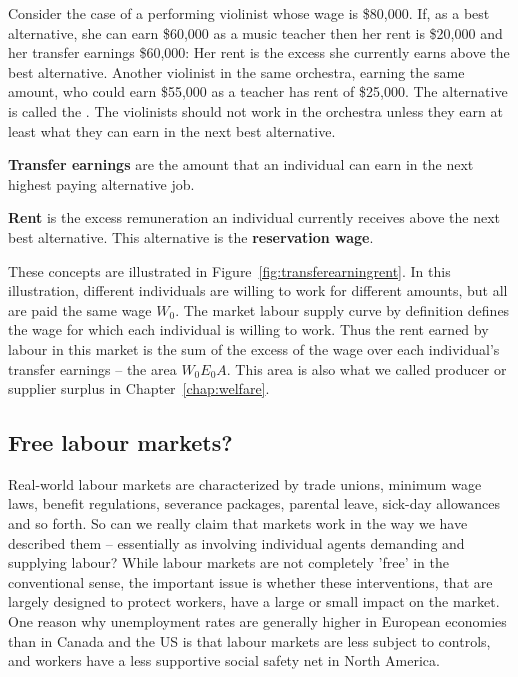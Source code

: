 Consider the case of a performing violinist whose wage is \$80,000. If, as a
best alternative, she can earn \$60,000 as a music teacher then her rent is
\$20,000 and her transfer earnings \$60,000: Her rent is the excess she
currently earns above the best alternative. Another violinist in the same
orchestra, earning the same amount, who could earn \$55,000 as a teacher has
rent of \$25,000. The alternative is called the . The violinists should not work in the orchestra unless they earn at
least what they can earn in the next best alternative.

\begin{DefBox}
\textbf{Transfer earnings} are the amount that an individual can earn in the next highest paying alternative job.

\textbf{Rent} is the excess remuneration an individual currently receives above the next best alternative. This alternative is the \textbf{reservation wage}.
\end{DefBox}

These concepts are illustrated in Figure~\ref{fig:transferearningrent}. In
this illustration, different individuals are willing to work for different
amounts, but all are paid the same wage $W_{0}$. The market labour supply
curve by definition defines the wage for which each individual is willing to
work. Thus the rent earned by labour in this market is the sum of the excess
of the wage over each individual's transfer earnings -- the area $W_{0}E_{0}A$. 
This area is also what we called producer or supplier surplus in Chapter~\ref{chap:welfare}.



\newhtmlpage

\subsection*{Free labour markets?}

Real-world labour markets are characterized by trade unions, minimum wage
laws, benefit regulations, severance packages, parental leave, sick-day
allowances and so forth. So can we really claim that markets work in the way
we have described them -- essentially as involving individual agents
demanding and supplying labour? While labour markets are not completely
'free' in the conventional sense, the important issue is whether these
interventions, that are largely designed to protect workers, have a large or
small impact on the market. One reason why
unemployment rates are generally higher in European economies than in Canada
and the US is that labour markets are less subject to controls, and workers
have a less supportive social safety net in North America.

